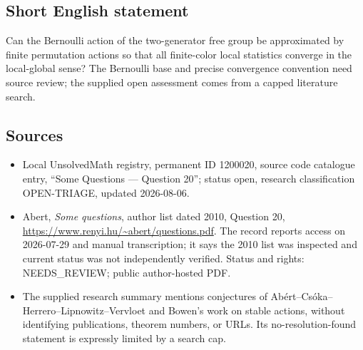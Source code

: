 \documentclass[11pt]{article}
\begin{document}
\subsection{Short English statement}
Can the Bernoulli action of the two-generator free group be approximated by finite permutation actions so that all finite-color local statistics converge in the local-global sense? The Bernoulli base and precise convergence convention need source review; the supplied open assessment comes from a capped literature search.
\subsection{Sources}
\begin{itemize}
\item Local UnsolvedMath registry, permanent ID 1200020, source code catalogue entry, ``Some Questions --- Question 20''; status open, research classification OPEN-TRIAGE, updated 2026-08-06.
\item Abert, \emph{Some questions}, author list dated 2010, Question 20, \url{https://www.renyi.hu/~abert/questions.pdf}. The record reports access on 2026-07-29 and manual transcription; it says the 2010 list was inspected and current status was not independently verified. Status and rights: NEEDS\_REVIEW; public author-hosted PDF.
\item The supplied research summary mentions conjectures of Ab\'ert--Cs\'oka--Herrero--Lipnowitz--Vervloet and Bowen's work on stable actions, without identifying publications, theorem numbers, or URLs. Its no-resolution-found statement is expressly limited by a search cap.
\end{itemize}
\end{document}
